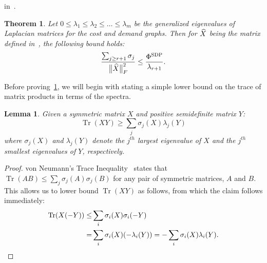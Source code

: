 \documentclass{article}
\newtheorem{theorem}{Theorem}[section]
\newtheorem{lemma}{Lemma}[section]
\DeclareMathOperator{\tr}{Tr}
\begin{document}
in~.
\begin{theorem} \label{lem:sigma-bnd} Let $0\le \lambda_1\le \lambda_2
  \le \ldots \le \lambda_m$ be the generalized eigenvalues of
  Laplacian matrices for the cost and demand graphs.  Then for
  $\widehat{{X}}$ being the matrix defined in~, the
  following bound holds:
\[
\frac { \sum_{j\ge r+1} \sigma_j }{ \big\| \widehat{{X}} \big\|^2_F
} \le \frac{\Phi^{\mathrm{SDP}}}{\lambda_{r+1}}.
\]
\end{theorem}
Before proving~\cref{lem:sigma-bnd}, we will begin with stating a
simple lower bound on the trace of matrix products in terms of the
spectra.
\begin{lemma}\label{thm:birkhoff} Given a symmetric matrix $X$ and
  positive semidefinite matrix $Y$:
\[
\tr(X Y) \ge \sum_j \sigma_j(X) \lambda_j(Y)
\] where $\sigma_j(X)$ and $\lambda_j(Y)$ denote the $j^{th}$ largest
eigenvalue of $X$ and the $j^{th}$ smallest eigenvalues of $Y$,
respectively.
\end{lemma} 
\begin{proof}
  von Neumann's Trace Inequality~\cite{hj-mat-book} states that $\tr(A
  B) \le \sum_j \sigma_j(A) \sigma_j(B)$ for any pair of symmetric
  matrices, $A$ and $B$. This allows us to lower bound $\tr(X Y)$ as
  follows, from which the claim follows immediately:
\begin{align*}
  \tr(X (-Y)) \le & \sum_i \sigma_i(X) \sigma_i(-Y) \\
  =& \sum_i \sigma_i(X) (-\lambda_i(Y)) = - \sum_i \sigma_i(X)
  \lambda_i(Y).  \qedhere
\end{align*} 
\end{proof}
\end{document}

